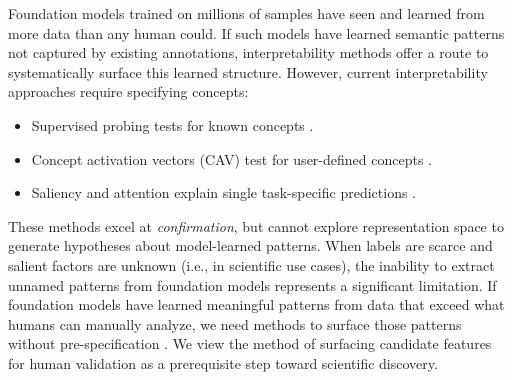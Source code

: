 \documentclass[runningheads]{llncs}
\begin{document}
Foundation models trained on millions of samples have seen and learned from more data than any human could.
If such models have learned semantic patterns not captured by existing annotations, interpretability methods offer a route to systematically surface this learned structure.
However, current interpretability approaches require specifying concepts:
\begin{itemize}
\item{Supervised probing tests for known concepts \citep{alain2016understanding}.}
\item{Concept activation vectors (CAV) test for user-defined concepts \citep{kim2018tcav}.}
\item{Saliency and attention explain single task-specific predictions \citep{selvaraju2017gradcam,sundararajan2017axiomatic,simonyan2013deep}.}
\end{itemize}
These methods excel at \textit{confirmation}, but cannot explore representation space to generate hypotheses about model-learned patterns.
When labels are scarce and salient factors are unknown (i.e., in scientific use cases), the inability to extract unnamed patterns from foundation models represents a significant limitation.
If foundation models have learned meaningful patterns from data that exceed what humans can manually analyze, we need methods to surface those patterns without pre-specification \citep{hughes2024open}.
We view the method of surfacing candidate features for human validation as a prerequisite step toward scientific discovery.

\end{document}
